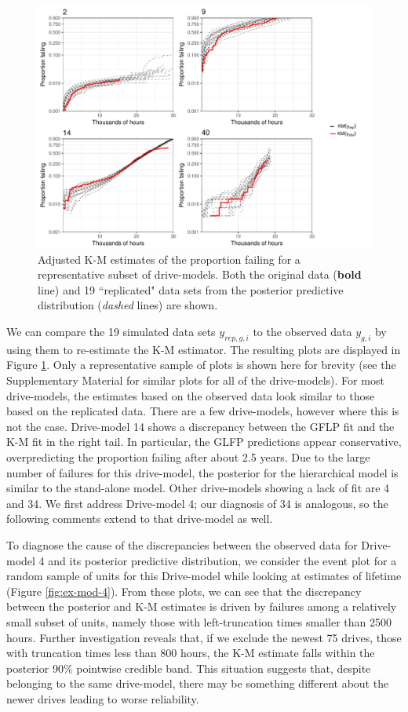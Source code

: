 \documentclass[12pt]{article}
\begin{document}
\begin{figure}[H]
\includegraphics[width=\textwidth]{ppcheck-sample}
\caption{Adjusted K-M estimates of the proportion failing for a representative subset of drive-models. Both the original data (\textbf{bold} line) and 19 ``replicated" data sets from the posterior predictive distribution (\textit{dashed} lines) are shown.}
\label{fig:post-pred-KM}
\end{figure}

We can compare the 19 simulated data sets $y_{rep,g, i}$ to the observed data $y_{g,i}$ by using them to re-estimate the K-M estimator. The resulting plots are displayed in Figure \ref{fig:post-pred-KM}. Only a representative sample of plots is shown here for brevity (see the Supplementary Material for similar plots for all of the drive-models).  For most drive-models, the estimates based on the observed data look similar to those based on the replicated data.  There are a few drive-models, however where this is not the case. Drive-model 14 shows a discrepancy between the GFLP fit and the K-M fit in the right tail. In particular, the GLFP predictions appear conservative, overpredicting the proportion failing after about 2.5 years. Due to the large number of failures for this drive-model, the posterior for the hierarchical model is similar to the stand-alone model. Other drive-models showing a lack of fit are 4 and 34. We first address Drive-model 4; our diagnosis of 34 is analogous, so the following comments extend to that drive-model as well.


To diagnose the cause of the discrepancies between the observed data for Drive-model 4 and its posterior predictive distribution, we consider the event plot for a random sample of units for this Drive-model while looking at estimates of lifetime (Figure \ref{fig:ex-mod-4}). From these plots, we can see that the discrepancy between the posterior and K-M estimates is driven by failures among a relatively small subset of units, namely those with left-truncation times smaller than 2500 hours. Further investigation reveals that, if we exclude the newest 75 drives, those with truncation times less than 800 hours, the K-M estimate falls within the posterior 90\% pointwise credible band. This situation suggests that, despite belonging to the same drive-model, there may be something different about the newer drives leading to worse reliability. 
\end{document}
